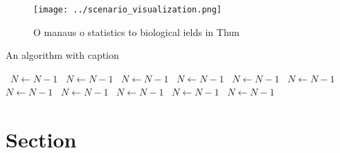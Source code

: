 \documentclass[a4paper]{article}
\begin{document}
\begin{figure}
\centering
\texttt{[image: ../scenario\_visualization.png]}
\caption{O manaus o statistics to biological ields in Thun
}
\end{figure}
 
\begin{algorithm}
\caption{An algorithm with caption}
\begin{algorithmic}
\    \State $N \gets N - 1$
\    \State $N \gets N - 1$
\    \State $N \gets N - 1$
\    \State $N \gets N - 1$
\    \State $N \gets N - 1$
\    \State $N \gets N - 1$
\    \State $N \gets N - 1$
\    \State $N \gets N - 1$
\    \State $N \gets N - 1$
\    \State $N \gets N - 1$
\    \State $N \gets N - 1$
\EndWhile
\end{algorithmic}
\end{algorithm}

\section{Section}
\end{document}
